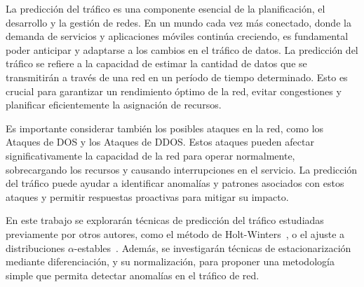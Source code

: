 La predicción del tráfico es una componente esencial de la planificación, el desarrollo y la gestión de redes. 
En un mundo cada vez más conectado, donde la demanda de servicios y aplicaciones móviles continúa creciendo, 
es fundamental poder anticipar y adaptarse a los cambios en el tráfico de datos.
La predicción del tráfico se refiere a la capacidad de estimar la cantidad de datos que se transmitirán 
a través de una red en un período de tiempo determinado. 
Esto es crucial para garantizar un rendimiento óptimo de la red, evitar congestiones y 
planificar eficientemente la asignación de recursos.

Es importante considerar también los posibles ataques en la red, como los Ataques de \ac{DOS}
y los Ataques de \ac{DDOS}. Estos ataques pueden afectar significativamente 
la capacidad de la red para operar normalmente, sobrecargando los recursos y causando interrupciones en el servicio. 
La predicción del tráfico puede ayudar a identificar anomalías y patrones asociados con estos ataques 
y permitir respuestas proactivas para mitigar su impacto.

En este trabajo se explorarán técnicas de predicción del tráfico estudiadas previamente por otros autores,
como el método de Holt-Winters~\cite{cabornero2021}, o el ajuste a distribuciones $\alpha$-estables~\cite{benjamin2023}.
Además, se investigarán técnicas de estacionarización mediante diferenciación, y su normalización, para
proponer una metodología simple que permita detectar anomalías en el tráfico de red.
